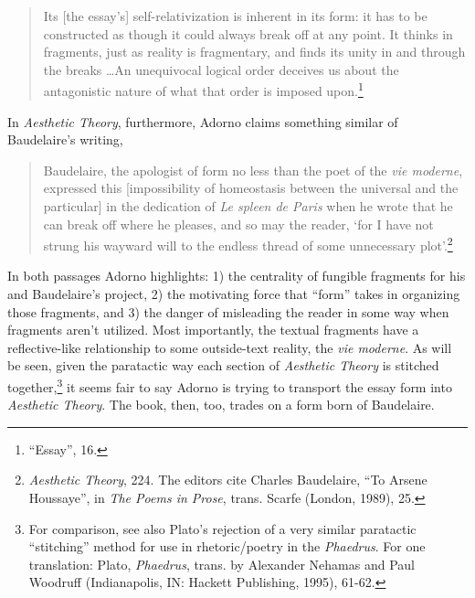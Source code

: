 \documentclass[12pt]{article}
\begin{document}
\begin{quote}
\begin{singlespace}
Its [the essay's] self-relativization is inherent in its form: it has to be constructed as though it could always break off at any point. It thinks in fragments, just as reality is fragmentary, and finds its unity in and through the breaks \dots  An unequivocal logical order deceives us about the antagonistic nature of what that order is imposed upon.\footnote{``Essay'', 16.}
\end{singlespace}
\end{quote}

\noindent In \textit{Aesthetic Theory}, furthermore, Adorno claims something similar of Baudelaire's writing,

\begin{quote}
\begin{singlespace}
Baudelaire, the apologist of form no less than the poet of the \textit{vie moderne}, expressed this [impossibility of homeostasis between the universal and the particular] in the dedication of \textit{Le spleen de Paris} when he wrote that he can break off where he pleases, and so may the reader, `for I have not strung his wayward will to the endless thread of some unnecessary plot'.\footnote{\textit{Aesthetic Theory}, 224. The editors cite Charles Baudelaire, ``To Arsene Houssaye'', in \textit{The Poems in Prose}, trans. Scarfe (London, 1989), 25.}
\end{singlespace}
\end{quote}

\noindent In both passages Adorno highlights: 1) the centrality of fungible fragments for his and Baudelaire's project, 2) the motivating force that ``form'' takes in organizing those fragments, and 3) the danger of misleading the reader in some way when fragments aren't utilized. Most importantly, the textual fragments have a reflective-like relationship to some outside-text reality, the \textit{vie moderne}. As will be seen, given the paratactic way each section of \textit{Aesthetic Theory} is stitched together,\footnote{For comparison, see also Plato's rejection of a very similar paratactic ``stitching'' method for use in rhetoric/poetry in the \textit{Phaedrus}. For one translation: Plato, \textit{Phaedrus}, trans. by Alexander Nehamas and Paul Woodruff (Indianapolis, IN: Hackett Publishing, 1995), 61-62.} it seems fair to say Adorno is trying to transport the essay form into \textit{Aesthetic Theory}. The book, then, too, trades on a form born of Baudelaire.   
\end{document}
